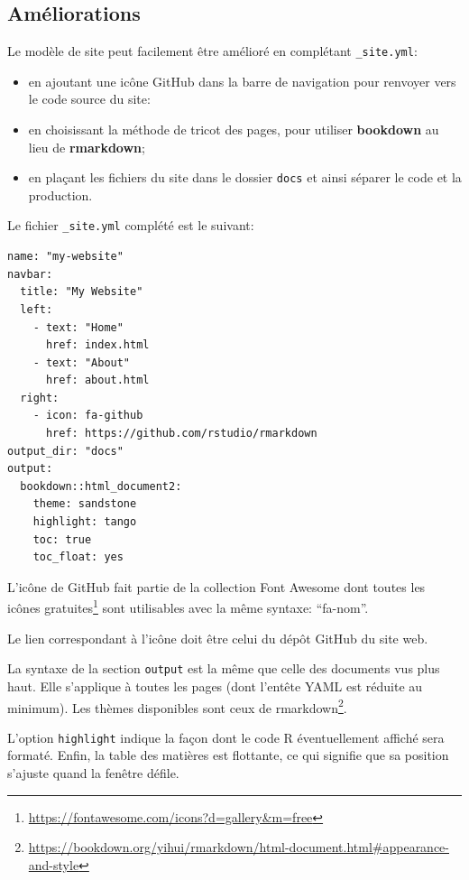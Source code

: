 \documentclass[
  12pt,
  french,
  a4paper,
  extrafontsizes,onecolumn,openright
  ]{memoir}
\providecommand{\tightlist}{%
  \setlength{\itemsep}{0pt}\setlength{\parskip}{0pt}}
\begin{document}
\hypertarget{amuxe9liorations}{%
\subsection{Améliorations}\label{amuxe9liorations}}

Le modèle de site peut facilement être amélioré en complétant \texttt{\_site.yml}:

\begin{itemize}
\tightlist
\item
  en ajoutant une icône GitHub dans la barre de navigation pour renvoyer vers le code source du site:
\item
  en choisissant la méthode de tricot des pages, pour utiliser \textbf{bookdown} au lieu de \textbf{rmarkdown};
\item
  en plaçant les fichiers du site dans le dossier \texttt{docs} et ainsi séparer le code et la production.
\end{itemize}

Le fichier \texttt{\_site.yml} complété est le suivant:

\begin{verbatim}
name: "my-website"
navbar:
  title: "My Website"
  left:
    - text: "Home"
      href: index.html
    - text: "About"
      href: about.html
  right:
    - icon: fa-github
      href: https://github.com/rstudio/rmarkdown
output_dir: "docs"
output:
  bookdown::html_document2:
    theme: sandstone
    highlight: tango
    toc: true
    toc_float: yes
\end{verbatim}

L'icône de GitHub fait partie de la collection Font Awesome dont toutes les icônes gratuites\footnote{\url{https://fontawesome.com/icons?d=gallery\&m=free}} sont utilisables avec la même syntaxe: \enquote{fa-nom}.

Le lien correspondant à l'icône doit être celui du dépôt GitHub du site web.

La syntaxe de la section \texttt{output} est la même que celle des documents vus plus haut.
Elle s'applique à toutes les pages (dont l'entête YAML est réduite au minimum).
Les thèmes disponibles sont ceux de rmarkdown\footnote{\url{https://bookdown.org/yihui/rmarkdown/html-document.html\#appearance-and-style}}.

L'option \texttt{highlight} indique la façon dont le code R éventuellement affiché sera formaté.
Enfin, la table des matières est flottante, ce qui signifie que sa position s'ajuste quand la fenêtre défile.
\end{document}
